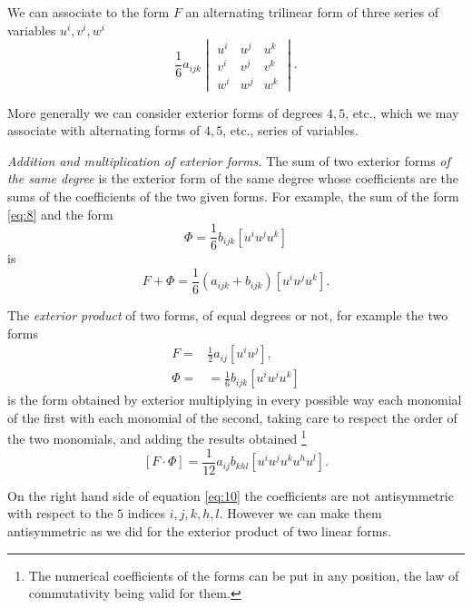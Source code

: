 We can associate to the form $F$ an alternating trilinear form of three series of variables $u^{i},v^{i},w^{i}$
\[
\frac{1}{6}a_{ijk}
\begin{vmatrix}
  u^{i}&u^{j}&u^{k}\\
  v^{i}&v^{j}&v^{k}\\
  w^{i}&w^{j}&w^{k}
\end{vmatrix}.
\]

More generally we can consider exterior forms of degrees $4,5$, {etc.}, which we may associate with alternating forms of $4,5$, {etc.}, series of variables.

\vspace{12pt}\fsec \emph{Addition and multiplication of exterior forms.} The sum of two exterior forms \emph{of the same degree} is the exterior form of the same degree whose coefficients are the sums of the coefficients of the two given forms. For example, the sum of the form \eqref{eq:8} and the form
\begin{equation}
  \label{eq:9}
  \Phi=\frac{1}{6}b_{ijk}[u^{i}u^{j}u^{k}]
\end{equation}
is
\[
F+\Phi=\frac{1}{6}(a_{ijk}+b_{ijk})[u^{i}u^{j}u^{k}].
\]

The \emph{exterior product} of two forms, of  equal degrees or not, for example the two forms
\begin{align*}
  F=&\frac{1}{2}a_{ij}[u^{i}u^{j}],\\
  \Phi=&=\frac{1}{6}b_{ijk}[u^{i}u^{j}u^{k}]
\end{align*}
is the form obtained by exterior multiplying in every possible way each monomial of the first  with each monomial of the second, taking care to respect the order of the two monomials, and adding the results obtained \footnote{The numerical coefficients of the forms can be put in any position, the law of commutativity being valid for them.}
\begin{equation}
  \label{eq:10}
  [F\cdot\Phi]=\frac{1}{12}a_{ij}b_{khl}[u^{i}u^{j}u^{k}u^{h}u^{l}].
\end{equation}

On the right hand side of equation \eqref{eq:10} the coefficients are not antisymmetric with respect to the $5$ indices $i,j,k,h,l$. However we can make them antisymmetric  as we did for the exterior product of two linear forms.

